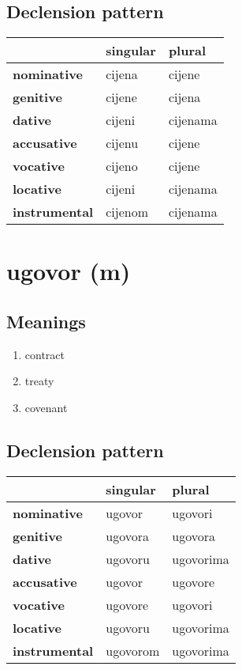 \subsection*{Declension pattern}
\begin{tabularx}{\linewidth}{Xll}
\toprule
{} & singular &    plural \\
\midrule
\textbf{nominative  } &   cijena &    cijene \\
\textbf{genitive    } &   cijene &    cijena \\
\textbf{dative      } &   cijeni &  cijenama \\
\textbf{accusative  } &   cijenu &    cijene \\
\textbf{vocative    } &   cijeno &    cijene \\
\textbf{locative    } &   cijeni &  cijenama \\
\textbf{instrumental} &  cijenom &  cijenama \\
\bottomrule
\end{tabularx}

\filbreak
\section{ugovor (m)}
\subsection*{Meanings}
\begin{enumerate}
\item contract
\item treaty
\item covenant
\end{enumerate}
\subsection*{Declension pattern}
\begin{tabularx}{\linewidth}{Xll}
\toprule
{} &  singular &     plural \\
\midrule
\textbf{nominative  } &    ugovor &    ugovori \\
\textbf{genitive    } &   ugovora &    ugovora \\
\textbf{dative      } &   ugovoru &  ugovorima \\
\textbf{accusative  } &    ugovor &    ugovore \\
\textbf{vocative    } &   ugovore &    ugovori \\
\textbf{locative    } &   ugovoru &  ugovorima \\
\textbf{instrumental} &  ugovorom &  ugovorima \\
\bottomrule
\end{tabularx}

